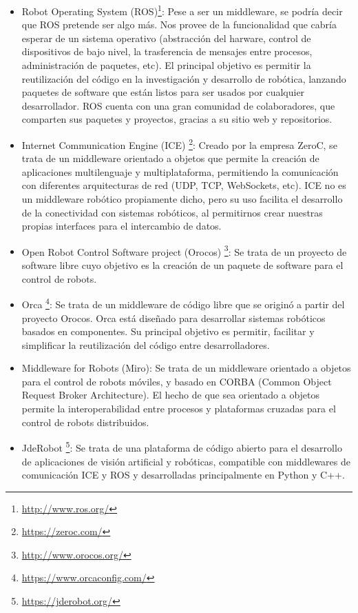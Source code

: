 \begin{itemize}
	\item Robot Operating System (ROS)\footnote{\url{http://www.ros.org/}}: Pese a ser un middleware, se podría decir que ROS pretende ser algo más. Nos provee de la funcionalidad que cabría esperar de un sistema operativo (abstracción del harware, control de dispositivos de bajo nivel, la trasferencia de mensajes entre procesos, administración de paquetes, etc). El principal objetivo es permitir la reutilización del código en la investigación y desarrollo de robótica, lanzando paquetes de software que están listos para ser usados por cualquier desarrollador. ROS cuenta con una gran comunidad de colaboradores, que comparten sus paquetes y proyectos, gracias a su sitio web y repositorios.
	\item Internet Communication Engine (ICE) \footnote{\url{https://zeroc.com/}}: Creado por la empresa ZeroC, se trata de un middleware orientado a objetos que permite la creación de aplicaciones multilenguaje y multiplataforma, permitiendo la comunicación con diferentes arquitecturas de red (UDP, TCP, WebSockets, etc). ICE no es un middleware robótico propiamente dicho, pero su uso facilita el desarrollo de la conectividad con sistemas robóticos, al permitirnos crear nuestras propias interfaces para el intercambio de datos.
	\item Open Robot Control Software project (Orocos) \footnote{\url{http://www.orocos.org/}}: Se trata de un proyecto de software libre cuyo objetivo es la creación de un paquete de software para el control de robots.
	\item Orca \footnote{\url{https://www.orcaconfig.com/}}: Se trata de un middleware de código libre que se originó a partir del proyecto Orocos. Orca está diseñado para desarrollar sistemas robóticos basados en componentes. Su principal objetivo es permitir, facilitar y simplificar la reutilización del código entre desarrolladores.
	\item Middleware for Robots (Miro): Se trata de un middleware orientado a objetos para el control de robots móviles, y basado en CORBA (Common Object Request Broker Architecture). El hecho de que sea orientado a objetos permite la interoperabilidad entre procesos y plataformas cruzadas para el control de robots distribuidos.
	\item JdeRobot \footnote{\url{https://jderobot.org/}}: Se trata de una plataforma de código abierto para el desarrollo de aplicaciones de visión artificial y robóticas, compatible con middlewares de comunicación ICE y ROS y desarrolladas principalmente en Python y C++.
\end{itemize}

